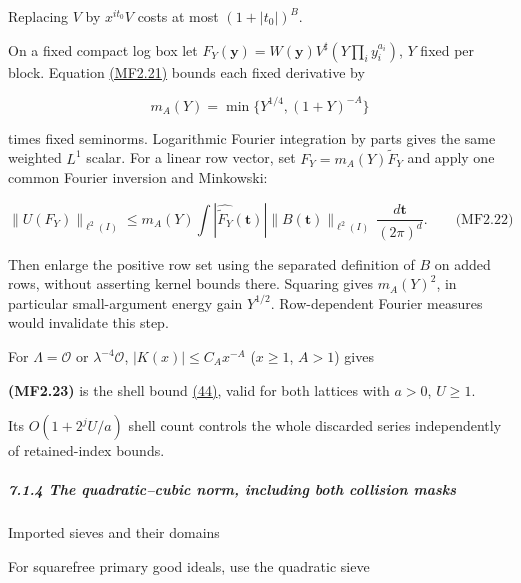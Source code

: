 Replacing \(V\) by \(x^{it_0}V\) costs at most \((1+|t_0|)^B\).

On a fixed compact log box let \(F_Y(\mathbf y)=W(\mathbf y)V^\sharp(Y\prod_i y_i^{a_i})\), \(Y\) fixed per block. Equation \protect\hyperlink{mf:eq:B2.21}{(MF2.21)} bounds each fixed derivative by

\[
m_A(Y)=\min\{Y^{1/4},(1+Y)^{-A}\}
\]

times fixed seminorms. Logarithmic Fourier integration by parts gives the same weighted \(L^1\) scalar. For a linear row vector, set \(F_Y=m_A(Y)\widetilde F_Y\) and apply one common Fourier inversion and Minkowski:

\hypertarget{mf:eq:B2.22}{}

\label{mf:eq:B2.22}

\[
\|U(F_Y)\|_{\ell^2(I)}
\le m_A(Y)\int |\widehat{\widetilde F_Y}(\mathbf t)|
\|B(\mathbf t)\|_{\ell^2(I)}\,\frac{d\mathbf t}{(2\pi)^d}.
\qquad\text{(MF2.22)}
\]

Then enlarge the positive row set using the separated definition of \(B\) on added rows, without asserting kernel bounds there. Squaring gives \(m_A(Y)^2\), in particular small-argument energy gain \(Y^{1/2}\). Row-dependent Fourier measures would invalidate this step.

For \(\Lambda=\mathcal O\) or \(\lambda^{-4}\mathcal O\), \(|K(x)|\le C_Ax^{-A}\) (\(x\ge1\), \(A>1\)) gives

\hypertarget{mf:eq:B2.23}{}

\label{mf:eq:B2.23}

\textbf{(MF2.23)} is the shell bound \protect\hyperlink{cf:eq:B.25}{(44)}, valid for both lattices with \(a>0\), \(U\ge1\).

Its \(O(1+2^jU/a)\) shell count controls the whole discarded series independently of retained-index bounds.

\hypertarget{the-quadraticcubic-norm-including-both-collision-masks}{}

\label{the-quadraticcubic-norm-including-both-collision-masks}

\hypertarget{the-quadraticcubic-norm-including-both-collision-masks-heading-2}{%
\subparagraph{7.1.4 The quadratic--cubic norm, including both collision masks}}

\hypertarget{imported-sieves-and-their-domains}{}

\label{imported-sieves-and-their-domains}

Imported sieves and their domains

For squarefree primary good ideals, use the quadratic sieve

